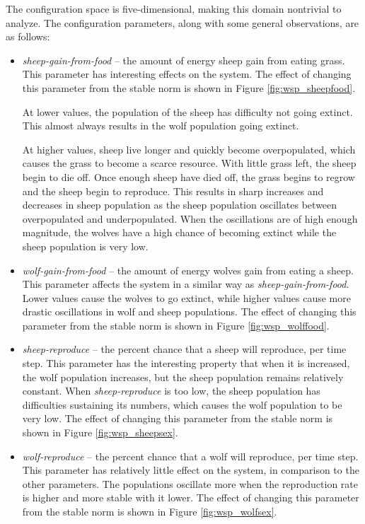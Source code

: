 The configuration space is five-dimensional, making this domain nontrivial to analyze.
The configuration parameters, along with some general observations, are as follows:
\begin{itemize}
   \item \textit{sheep-gain-from-food} -- the amount of energy sheep gain from eating grass.
This parameter has interesting effects on the system.
The effect of changing this parameter from the stable norm is shown in Figure \ref{fig:wsp_sheepfood}.

At lower values, the population of the sheep has difficulty not going extinct.
This almost always results in the wolf population going extinct.

At higher values, sheep live longer and quickly become overpopulated, which causes the grass to become a scarce resource.
With little grass left, the sheep begin to die off.
Once enough sheep have died off, the grass begins to regrow and the sheep begin to reproduce.
This results in sharp increases and decreases in sheep population as the sheep population oscillates between overpopulated and underpopulated.
When the oscillations are of high enough magnitude, the wolves have a high chance of becoming extinct while the sheep population is very low.


   \item \textit{wolf-gain-from-food} -- the amount of energy wolves gain from eating a sheep.
This parameter affects the system in a similar way as \textit{sheep-gain-from-food}.
Lower values cause the wolves to go extinct, while higher values cause more drastic oscillations in wolf and sheep populations.
The effect of changing this parameter from the stable norm is  shown in Figure \ref{fig:wsp_wolffood}.

   \item \textit{sheep-reproduce} -- the percent chance that a sheep will reproduce, per time step.
This parameter has the interesting property that when it is increased, the wolf population increases, but the sheep population remains relatively constant.
When \textit{sheep-reproduce} is too low, the sheep population has difficulties sustaining its numbers, which causes the wolf population to be very low.
The effect of changing this parameter from the stable norm is  shown in Figure \ref{fig:wsp_sheepsex}.

   \item \textit{wolf-reproduce} -- the percent chance that a wolf will reproduce, per time step.
This parameter has relatively little effect on the system, in comparison to the other parameters.
The populations oscillate more when the reproduction rate is higher and more stable with it lower.
The effect of changing this parameter from the stable norm is  shown in Figure \ref{fig:wsp_wolfsex}.


\end{itemize}
